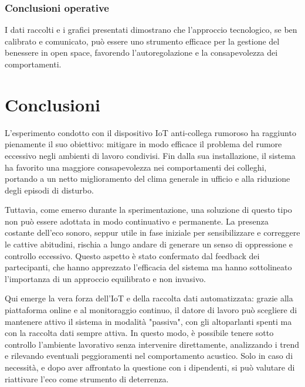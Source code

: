 \documentclass[fleqn,10pt]{SelfArx} %
\begin{document}
\subsubsection{Conclusioni operative}

I dati raccolti e i grafici presentati dimostrano che l'approccio tecnologico, se ben calibrato e comunicato, può essere uno strumento efficace per la gestione del benessere in open space, favorendo l'autoregolazione e la consapevolezza dei comportamenti.


\section{Conclusioni}


L'esperimento condotto con il dispositivo IoT anti-collega rumoroso ha raggiunto pienamente il suo obiettivo: mitigare in modo efficace il problema del rumore eccessivo negli ambienti di lavoro condivisi. Fin dalla sua installazione, il sistema ha favorito una maggiore consapevolezza nei comportamenti dei colleghi, portando a un netto miglioramento del clima generale in ufficio e alla riduzione degli episodi di disturbo. \newline

Tuttavia, come emerso durante la sperimentazione, una soluzione di questo tipo non può essere adottata in modo continuativo e permanente. La presenza costante dell'eco sonoro, seppur utile in fase iniziale per sensibilizzare e correggere le cattive abitudini, rischia a lungo andare di generare un senso di oppressione e controllo eccessivo. Questo aspetto è stato confermato dal feedback dei partecipanti, che hanno apprezzato l'efficacia del sistema ma hanno sottolineato l'importanza di un approccio equilibrato e non invasivo. \newline

Qui emerge la vera forza dell'IoT e della raccolta dati automatizzata: grazie alla piattaforma online e al monitoraggio continuo, il datore di lavoro può scegliere di mantenere attivo il sistema in modalità "passiva", con gli altoparlanti spenti ma con la raccolta dati sempre attiva. In questo modo, è possibile tenere sotto controllo l'ambiente lavorativo senza intervenire direttamente, analizzando i trend e rilevando eventuali peggioramenti nel comportamento acustico. Solo in caso di necessità, e dopo aver affrontato la questione con i dipendenti, si può valutare di riattivare l'eco come strumento di deterrenza. \newline
\end{document}

